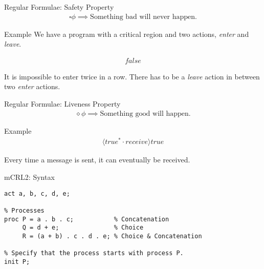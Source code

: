\documentclass[aspectratio=1610]{beamer}
\begin{document}
  \begin{frame}{Regular Formulae: Safety Property}
    \begin{align*}
      \square\phi \implies \text{Something bad will never happen.}
    \end{align*}

    \begin{exampleblock}{Example}
      We have a program with a critical region and two actions, \textit{enter} and \textit{leave}.

      \begin{align*}
        [true^*\cdot enter \cdot \overline{leave}^* \cdot enter]false
      \end{align*}

      It is impossible to enter twice in a row. There has to be a \textit{leave} action in between two \textit{enter} actions.
    \end{exampleblock}
  \end{frame}

  \begin{frame}{Regular Formulae: Liveness Property}
    \begin{align*}
      \diamond\phi \implies \text{Something good will happen.}
    \end{align*}

    \begin{exampleblock}{Example}
      \begin{align*}
        [true^*\cdot send]\langle true^* \cdot receive \rangle true
      \end{align*}

      Every time a message is sent, it can eventually be received.
    \end{exampleblock}
  \end{frame}

  \begin{frame}[fragile]{mCRL2: Syntax}
    \begin{lstlisting}[language=mCRL2]
% Actions
act a, b, c, d, e;

% Processes
proc P = a . b . c;           % Concatenation
     Q = d + e;               % Choice
     R = (a + b) . c . d . e; % Choice & Concatenation

% Specify that the process starts with process P.
init P;
    \end{lstlisting}
  \end{frame}
\end{document}
